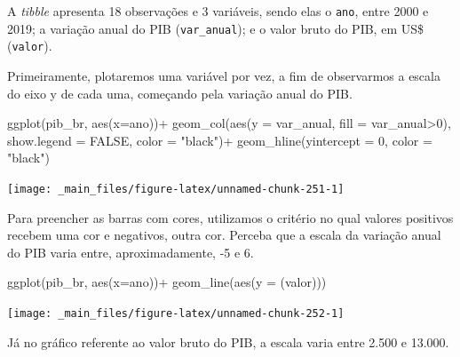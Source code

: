 \documentclass[
  brazilian,
]{book}
\newenvironment{Shaded}{\begin{snugshade}}{\end{snugshade}}
\newcommand{\AttributeTok}[1]{\textcolor[rgb]{0.77,0.63,0.00}{#1}}
\newcommand{\ConstantTok}[1]{\textcolor[rgb]{0.00,0.00,0.00}{#1}}
\newcommand{\DecValTok}[1]{\textcolor[rgb]{0.00,0.00,0.81}{#1}}
\newcommand{\FunctionTok}[1]{\textcolor[rgb]{0.00,0.00,0.00}{#1}}
\newcommand{\NormalTok}[1]{#1}
\newcommand{\SpecialCharTok}[1]{\textcolor[rgb]{0.00,0.00,0.00}{#1}}
\newcommand{\StringTok}[1]{\textcolor[rgb]{0.31,0.60,0.02}{#1}}
\begin{document}
A \emph{tibble} apresenta 18 observações e 3 variáveis, sendo elas o \texttt{ano}, entre 2000 e 2019; a variação anual do PIB (\texttt{var\_anual}); e o valor bruto do PIB, em US\$ (\texttt{valor}).

Primeiramente, plotaremos uma variável por vez, a fim de observarmos a escala do eixo y de cada uma, começando pela variação anual do PIB.

\begin{Shaded}
\begin{Highlighting}[]
\FunctionTok{ggplot}\NormalTok{(pib\_br,}
       \FunctionTok{aes}\NormalTok{(}\AttributeTok{x=}\NormalTok{ano))}\SpecialCharTok{+}
  \FunctionTok{geom\_col}\NormalTok{(}\FunctionTok{aes}\NormalTok{(}\AttributeTok{y =}\NormalTok{ var\_anual,}
               \AttributeTok{fill =}\NormalTok{ var\_anual}\SpecialCharTok{\textgreater{}}\DecValTok{0}\NormalTok{),}
           \AttributeTok{show.legend =} \ConstantTok{FALSE}\NormalTok{,}
           \AttributeTok{color =} \StringTok{"black"}\NormalTok{)}\SpecialCharTok{+}
  \FunctionTok{geom\_hline}\NormalTok{(}\AttributeTok{yintercept =} \DecValTok{0}\NormalTok{, }\AttributeTok{color =} \StringTok{"black"}\NormalTok{)}
\end{Highlighting}
\end{Shaded}

\begin{center}\texttt{[image: \_main\_files/figure-latex/unnamed-chunk-251-1]} \end{center}

Para preencher as barras com cores, utilizamos o critério no qual valores positivos recebem uma cor e negativos, outra cor. Perceba que a escala da variação anual do PIB varia entre, aproximadamente, -5 e 6.

\begin{Shaded}
\begin{Highlighting}[]
\FunctionTok{ggplot}\NormalTok{(pib\_br,}
       \FunctionTok{aes}\NormalTok{(}\AttributeTok{x=}\NormalTok{ano))}\SpecialCharTok{+}
  \FunctionTok{geom\_line}\NormalTok{(}\FunctionTok{aes}\NormalTok{(}\AttributeTok{y =}\NormalTok{ (valor)))}
\end{Highlighting}
\end{Shaded}

\begin{center}\texttt{[image: \_main\_files/figure-latex/unnamed-chunk-252-1]} \end{center}

Já no gráfico referente ao valor bruto do PIB, a escala varia entre 2.500 e 13.000.
\end{document}
